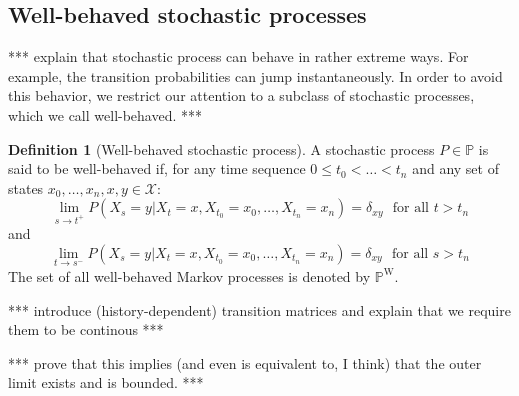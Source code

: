 \documentclass[10pt]{paper}
\theoremstyle{definition}
\newtheorem{definition}{Definition}
\newcommand{\states}{\mathcal{X}}
\newcommand{\processes}{\mathbb{P}}
\newcommand{\wprocesses}{\processes^{\mathrm{W}}}
\newcommand{\gambles}{\mathcal{L}}
\newcommand{\gamblesX}{\gambles(\states)}
\begin{document}
\subsection{Well-behaved stochastic processes}

*** explain that stochastic process can behave in rather extreme ways. For example, the transition probabilities can jump instantaneously. In order to avoid this behavior, we restrict our attention to a subclass of stochastic processes, which we call well-behaved. ***

\begin{definition}[Well-behaved stochastic process]
A stochastic process $P\in\processes$ is said to be well-behaved if, for any time sequence $0\leq t_0<\dots<t_{n}$ and any set of states $x_{0},\dots,x_{n},x,y\in\states$:
\begin{equation*}
\lim_{s\to t^{+}}P(X_s=y\vert X_t=x, X_{t_0}=x_{0}, \dots, X_{t_n}=x_{n})=\delta_{xy}
\text{~~for all $t>t_n$}
\end{equation*}
and
\begin{equation*}
\lim_{t\to s^{-}}P(X_s=y\vert X_t=x, X_{t_0}=x_{0}, \dots, X_{t_n}=x_{n})=\delta_{xy}
\text{~~for all $s>t_n$}
\end{equation*}
The set of all well-behaved Markov processes is denoted by $\wprocesses$.
\end{definition}

*** introduce (history-dependent) transition matrices and explain that we require them to be continous ***

*** prove that this implies (and even is equivalent to, I think) that the outer limit exists and is bounded. ***



\end{document}

